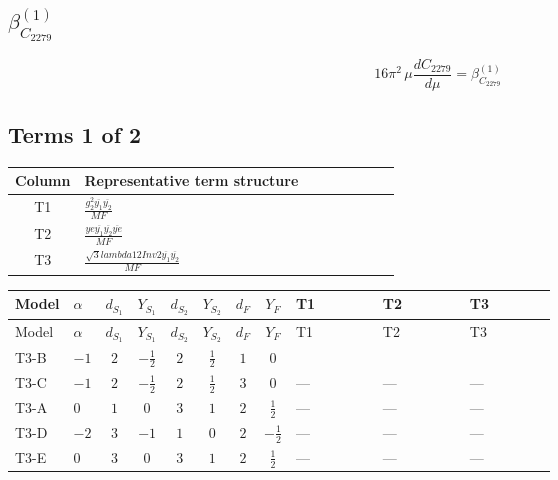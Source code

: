 \documentclass[8pt]{article}
\begin{document}
\begin{landscape}
\section*{$\beta_{C_{2279}}^{(1)}$}
\[16\pi^2\,\mu\frac{d C_{2279}}{d\mu}=\beta_{C_{2279}}^{(1)}\]
\subsection*{Terms 1 of 2}
\begin{center}
\begin{tabular}{@{}c >{\raggedright\arraybackslash}p{0.82\linewidth}@{}}
\toprule
Column & Representative term structure \\
\midrule
T1 & \(\displaystyle \frac{g_{2}^{2} \overline{y_{1}} \overline{y_{2}}}{MF}\) \\
\midrule
T2 & \(\displaystyle \frac{ye \overline{y_{1}} \overline{y_{2}} \overline{ye}}{MF}\) \\
\midrule
T3 & \(\displaystyle \frac{\sqrt{3} lambda12Inv2 \overline{y_{1}} \overline{y_{2}}}{MF}\) \\
\midrule
\bottomrule
\end{tabular}
\end{center}
\smallskip
\tiny
\begin{longtable}{@{}llcccccc >{\raggedright\arraybackslash}p{0.21\linewidth} >{\raggedright\arraybackslash}p{0.21\linewidth} >{\raggedright\arraybackslash}p{0.21\linewidth}@{}}
\toprule
Model & $\alpha$ & $d_{S_1}$ & $Y_{S_1}$ & $d_{S_2}$ & $Y_{S_2}$ & $d_F$ & $Y_F$ & T1 & T2 & T3 \\
\midrule
\endfirsthead
\toprule
Model & $\alpha$ & $d_{S_1}$ & $Y_{S_1}$ & $d_{S_2}$ & $Y_{S_2}$ & $d_F$ & $Y_F$ & T1 & T2 & T3 \\
\midrule
\endhead
T3-B & $-1$ & $2$ & $-\frac{1}{2}$ & $2$ & $\frac{1}{2}$ & $1$ & $0$ & \scriptsize\adjustbox{max width=\linewidth}{$\begin{gathered} \frac{3 g_{2}^{2} \overline{y_{1}} \overline{y_{2}}}{4 MF}\end{gathered}$} & \scriptsize\adjustbox{max width=\linewidth}{$\begin{gathered} - \frac{ye \overline{y_{1}} \overline{y_{2}} \overline{ye}}{4 MF}\end{gathered}$} & \scriptsize\adjustbox{max width=\linewidth}{$\begin{gathered} \frac{\sqrt{3} lambda12Inv2 \overline{y_{1}} \overline{y_{2}}}{3 MF}\end{gathered}$} \\
\midrule
T3-C & $-1$ & $2$ & $-\frac{1}{2}$ & $2$ & $\frac{1}{2}$ & $3$ & $0$ & --- & --- & --- \\
\midrule
T3-A & $0$ & $1$ & $0$ & $3$ & $1$ & $2$ & $\frac{1}{2}$ & --- & --- & --- \\
\midrule
T3-D & $-2$ & $3$ & $-1$ & $1$ & $0$ & $2$ & $-\frac{1}{2}$ & --- & --- & --- \\
\midrule
T3-E & $0$ & $3$ & $0$ & $3$ & $1$ & $2$ & $\frac{1}{2}$ & --- & --- & --- \\
\midrule
\bottomrule
\end{longtable}
\clearpage

\end{landscape}
\end{document}
